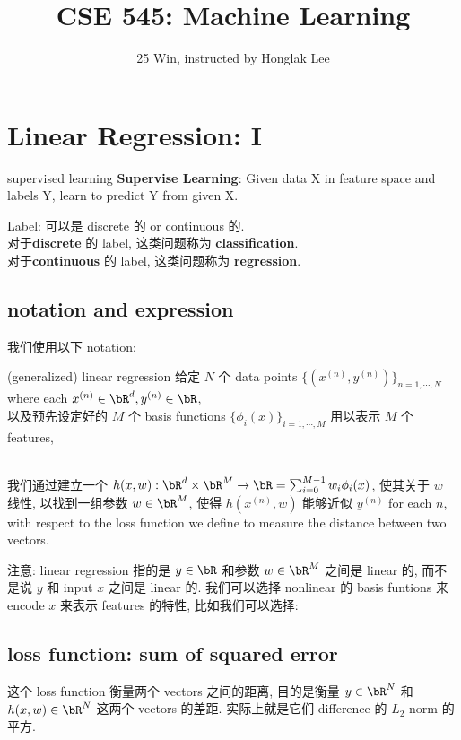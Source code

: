 \documentclass[lang=cn,11pt]{elegantbook}
\title{CSE 545: Machine Learning}
\subtitle{25 Win, instructed by Honglak Lee}
\begin{document}
\frontmatter
\tableofcontents
\mainmatter

\chapter{Linear Regression: I}

\begin{definition}{supervised learning}
\textbf{Supervise Learning}: Given data X in feature space and labels Y, learn to predict Y from given X.    
\end{definition}
\noindent Label: 可以是 discrete 的 or continuous 的.\\
对于\textbf{discrete} 的 label, 这类问题称为 \textbf{classification}.\\
对于\textbf{continuous} 的 label, 这类问题称为 \textbf{regression}.\\


\section{notation and expression}
我们使用以下 notation:

\begin{definition}{(generalized) linear regression}
给定 $N$ 个 data points $\{(x^{(n)},y^{(n)}) \}_{n=1,\cdots, N}$ where each $x^{(n)}\in\bR^d,y^{(n)}  \in\bR$, \\
以及预先设定好的 $M$ 个 basis functions $\{ \phi_i(x)\}_{i=1,\cdots, M}$ 用以表示 $M$ 个 features,\\\
   
我们通过建立一个 $h(x,w): \bR^d \times \bR^M \rar \bR = \sum_{i=0}^{M-1} w_i \phi_i(x)$, 使其关于 $w$ 线性, 以找到一组参数 $w \in \bR^M$, 使得 $h(x^{(n)},w)$ 能够近似 $y^{(n)}$ for each $n$, with respect to the loss function we define to measure the distance between two vectors. 
\end{definition}
\begin{remark}
    注意: linear regression 指的是 $y\in\bR$ 和参数 $w \in \bR^M$ 之间是 linear 的, 而不是说 $y$ 和 input $x$ 之间是 linear 的. 我们可以选择 nonlinear 的 basis funtions 来 encode $x$ 来表示 features 的特性, 比如我们可以选择:
\end{remark}




\section{loss function: sum of squared error}
这个 loss function 衡量两个 vectors 之间的距离, 目的是衡量 $y \in \bR^N$ 和 $h(x,w) \in \bR^N$ 这两个 vectors 的差距. 实际上就是它们 difference 的 $L_2$-norm 的平方.
\end{document}

